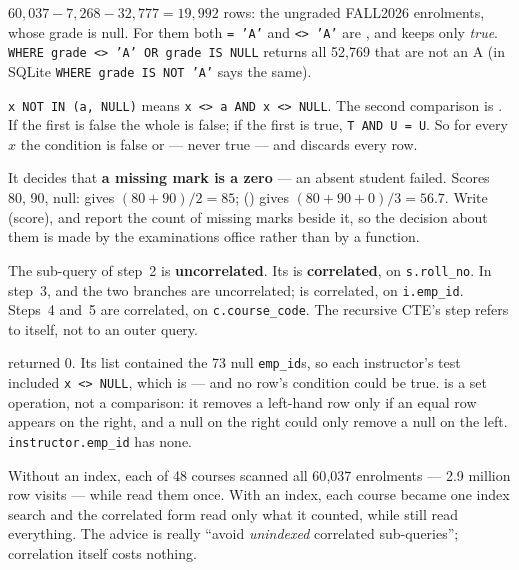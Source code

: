 \begin{ans}
  \item $60{,}037 - 7{,}268 - 32{,}777 = 19{,}992$ rows: the ungraded FALL2026
        enrolments, whose grade is null. For them both \texttt{= 'A'} and
        \texttt{<> 'A'} are \unk{}, and  keeps only \emph{true}.
        \texttt{WHERE grade <> 'A' OR grade IS NULL} returns all 52{,}769 that
        are not an A (in SQLite \texttt{WHERE grade IS NOT 'A'} says the same).
  \item \texttt{x NOT IN (a, NULL)} means \texttt{x <> a AND x <> NULL}. The
        second comparison is \unk{}. If the first is false the whole is false;
        if the first is true, \texttt{T AND U = U}. So for every $x$ the
        condition is false or \unk{} --- never true --- and 
        discards every row.
  \item It decides that \textbf{a missing mark is a zero} --- an absent
        student failed. Scores 80, 90, null:  gives
        $(80+90)/2 = 85$; () gives $(80+90+0)/3 =
        56.7$. Write (score), and report the count of missing marks
        beside it, so the decision about them is made by the examinations
        office rather than by a function.
\end{ans}

\begin{ans}
  \item The  sub-query of step~2 is \textbf{uncorrelated}. Its
         is \textbf{correlated}, on \texttt{s.roll\_no}. In
        step~3,  and the two  branches are
        uncorrelated;  is correlated, on \texttt{i.emp\_id}.
        Steps~4 and~5 are correlated, on \texttt{c.course\_code}. The recursive
        CTE's step refers to itself, not to an outer query.
  \item {} returned 0. Its list contained the 73 null
        \texttt{emp\_id}s, so each instructor's test included \texttt{x <>
        NULL}, which is \unk{} --- and no row's condition could be true.
         is a set operation, not a comparison: it removes a
        left-hand row only if an equal row appears on the right, and a null on
        the right could only remove a null on the left. \texttt{instructor.emp\_id}
        has none.
  \item Without an index, each of 48 courses scanned all 60{,}037
        enrolments --- 2.9 million row visits --- while  read
        them once. With an index, each course became one index search and the
        correlated form read only what it counted, while  still
        read everything. The advice is really ``avoid \emph{unindexed}
        correlated sub-queries''; correlation itself costs nothing.
\end{ans}

